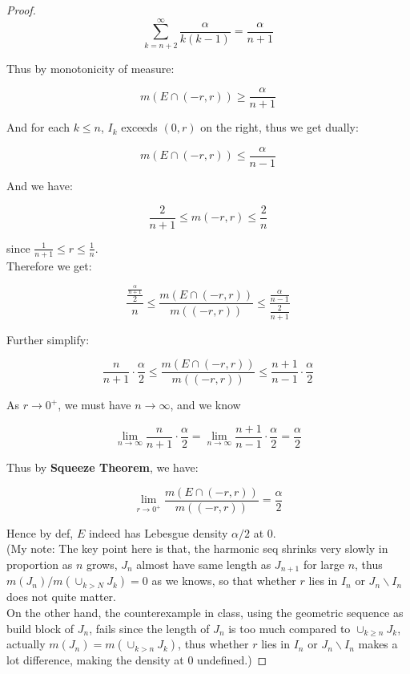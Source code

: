 \documentclass{qlnotes-export}
\begin{document}
\begin{proof}
\[\sum\limits_{k = n + 2}^{\infty}\frac{\alpha}{k(k - 1)} = \frac{\alpha}{n + 1}\]

Thus by monotonicity of measure:

\[m(E \cap ( - r,r)) \geq \frac{\alpha}{n + 1}\]

And for each \(k \leq n\), \(I_{k}\) exceeds \((0,r)\) on the right, thus we get dually:

\[m(E \cap ( - r,r)) \leq \frac{\alpha}{n - 1}\]

And we have:

\[\frac{2}{n + 1} \leq m( - r,r) \leq \frac{2}{n}\]

since \(\frac{1}{n + 1} \leq r \leq \frac{1}{n}\).\\
Therefore we get:

\[\frac{\frac{\frac{\alpha}{n + 1}}{2}}{n} \leq \frac{m(E \cap ( - r,r))}{m(( - r,r))} \leq \frac{\frac{\alpha}{n - 1}}{\frac{2}{n + 1}}\]

Further simplify:

\[\frac{n}{n + 1} \cdot \frac{\alpha}{2} \leq \frac{m(E \cap ( - r,r))}{m(( - r,r))} \leq \frac{n + 1}{n - 1} \cdot \frac{\alpha}{2}\]

As \(r\rightarrow 0^{+}\), we must have \(n\rightarrow\infty\), and we know

\[\lim\limits_{n\rightarrow\infty}\frac{n}{n + 1} \cdot \frac{\alpha}{2} = \lim\limits_{n\rightarrow\infty}\frac{n + 1}{n - 1} \cdot \frac{\alpha}{2} = \frac{\alpha}{2}\]

Thus by \textbf{Squeeze Theorem}, we have:

\[\lim\limits_{r\rightarrow 0^{+}}\frac{m(E \cap ( - r,r))}{m(( - r,r))} = \frac{\alpha}{2}\]

Hence by def, \(E\) indeed has Lebesgue density \(\alpha/2\) at \(0\).\\
(My note: The key point here is that, the harmonic seq shrinks very slowly in proportion as \(n\) grows, \(J_{n}\) almost have same length as \(J_{n + 1}\) for large \(n\), thus \(m(J_{n})/m( \cup_{k > N}J_{k}) = 0\) as we knows, so that whether \(r\) lies in \(I_{n}\) or \(J_{n}\backslash I_{n}\) does not quite matter.\\
On the other hand, the counterexample in class, using the geometric sequence as build block of \(J_{n}\), fails since the length of \(J_{n}\) is too much compared to \(\cup_{k \geq n}J_{k}\), actually \(m(J_{n}) = m( \cup_{k > n}J_{k})\), thus whether \(r\) lies in \(I_{n}\) or \(J_{n}\backslash I_{n}\) makes a lot difference, making the density at \(0\) undefined.)

\end{proof}
\end{document}

